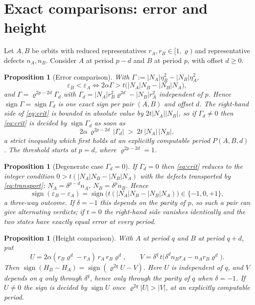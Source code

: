 \documentclass[11pt]{article}
\newtheorem{proposition}[theorem]{Proposition}
\theoremstyle{definition}
\theoremstyle{remark}
\newcommand{\pr}{\varrho}
\newcommand{\gam}{\Gamma}
\DeclareMathOperator{\sgn}{sign}
\begin{document}
\section{Exact comparisons: error and height}\label{sec:compare}

Let $A,B$ be orbits with reduced representatives $r_A,r_B\in[1,\pr)$ and representative defects
$n_A,n_B$. Consider $A$ at period $p-d$ and $B$ at period $p$, with offset $d\ge0$.

\begin{proposition}[Error comparison]\label{prop:err}
With $\gam:=|N_A|\eta_B^2-|N_B|\eta_A^2$,
\begin{equation}\label{eq:crit}
\varepsilon_B<\varepsilon_A
\iff
2\alpha\gam>t\bigl(|N_A|N_B-|N_B|N_A\bigr),
\end{equation}
and $\gam=\pr^{2p-2d}\gam_d$ with
$\gam_d=|N_A|r_B^2\pr^{2d}-|N_B|r_A^2$ independent of $p$. Hence
$\sgn\gam=\sgn\gam_d$ is one exact sign per pair $(A,B)$ and offset $d$. The right-hand side of
\eqref{eq:crit} is bounded in absolute value by $2t|N_A||N_B|$, so if $\gam_d\neq0$ then
\eqref{eq:crit} is decided by $\sgn\gam_d$ as soon as
\begin{equation}\label{eq:thr}
2\alpha\,\pr^{2p-2d}\,|\gam_d|\;>\;2t\,|N_A|\,|N_B| ,
\end{equation}
a strict inequality which first holds at an explicitly computable period $P(A,B,d)$. The
threshold starts at $p=d$, where $\pr^{2p-2d}=1$.
\end{proposition}

\begin{proposition}[Degenerate case $\gam_d=0$]\label{prop:gamma0}
If $\gam_d=0$ then \eqref{eq:crit} reduces to the integer condition
$0>t(|N_A|N_B-|N_B|N_A)$ with the defects transported by \eqref{eq:transport}:
$N_A=\delta^{p-d}n_A$, $N_B=\delta^{p}n_B$. Hence
\begin{equation}\label{eq:tiesign}
\sgn(\varepsilon_B-\varepsilon_A)=\sgn\bigl(t(|N_A|N_B-|N_B|N_A)\bigr)\in\{-1,0,+1\},
\end{equation}
a three-way outcome. If $\delta=-1$ this depends on the parity of $p$, so such a pair can give
\emph{alternating} verdicts; if $t=0$ the right-hand side vanishes identically and the two
states have \emph{exactly equal} error at every period.
\end{proposition}

\begin{proposition}[Height comparison]\label{prop:height}
With $A$ at period $q$ and $B$ at period $q+d$, put
\[
U=2\alpha(r_B\pr^{d}-r_A)\,r_A\,r_B\pr^{d},\qquad
V=\delta^{q}\,t\bigl(\delta^{d}n_B r_A-n_A r_B\pr^{d}\bigr).
\]
Then $\sgn(H_B-H_A)=\sgn(\pr^{2q}U-V)$. Here $U$ is independent of $q$, and $V$ depends on $q$
only through $\delta^q$, hence only through the parity of $q$ when $\delta=-1$. If $U\neq0$ the
sign is decided by $\sgn U$ once $\pr^{2q}|U|>|V|$, at an explicitly computable period.
\end{proposition}
\end{document}
